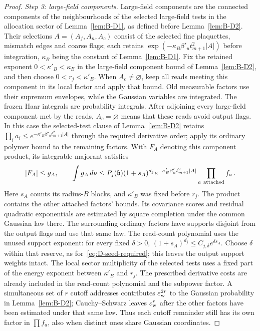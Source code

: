 \begin{proof}
\emph{Step 3: large-field components.} Large-field components are the connected components of the neighbourhoods of the selected large-field tests in the allocation sector of Lemma~\ref{lem:B-D1}, as defined before Lemma~\ref{lem:B-D2}. Their selections $A=(A_f,A_n,A_c)$ consist of the selected fine plaquettes, mismatch edges and coarse flags; each retains $\exp(-\kappa_B\beta'_u t_{m+1}^2|A|)$ before integration, $\kappa_B$ being the constant of Lemma~\ref{lem:B-D1}. Fix the retained exponent $0<\kappa'_B<\kappa_B$ in the large-field component bound of Lemma~\ref{lem:B-D2}, and then choose $0<r_j<\kappa'_B$. When $A_c\ne\varnothing$, keep all reads meeting this component in its local factor and apply that bound. Old measurable factors use their supremum envelopes, while the Gaussian variables are integrated. The frozen Haar integrals are probability integrals. After adjoining every large-field component met by the reads, $A_c=\varnothing$ means that these reads avoid output flags. In this case the selected-test clause of Lemma~\ref{lem:B-D2} retains $\prod_i a_i\le e^{-\kappa'_B\beta'_u t_{m+1}^2|A|}$ through the required derivative order; apply its ordinary polymer bound to the remaining factors. With $F_A$ denoting this component product, its integrable majorant satisfies
\begin{equation*}
|F_A|\le g_A,\qquad
\int g_A\,d\nu\le P_j(\mathfrak b)(1+s_A)^{d_j}
 e^{-\kappa'_B\beta'_u t_{m+1}^2|A|}\prod_{a\ {\rm attached}}f_a\,.
\end{equation*}
Here $s_A$ counts its radius-$B$ blocks, and $\kappa'_B$ was fixed before $r_j$. The product contains the other attached factors' bounds. Its covariance scores and residual quadratic exponentials are estimated by square completion under the common Gaussian law there. The surrounding ordinary factors have supports disjoint from the output flags and use that same law. The read-count polynomial uses the unused support exponent: for every fixed $\delta>0$, $(1+s_A)^{d_j}\le C_{j,\delta}e^{\delta s_A}$. Choose $\delta$ within that reserve, as for~\eqref{eq:D-seed-required}; this leaves the output support weights intact. The local sector multiplicity of the selected tests uses a fixed part of the energy exponent between $\kappa'_B$ and $r_j$. The prescribed derivative costs are already included in the read-count polynomial and the subpower factor. A simultaneous set of $r$ cutoff addresses contributes $\varepsilon_{\rm w}^{2r}$ to the Gaussian probability in Lemma~\ref{lem:B-D2}; Cauchy--Schwarz leaves $\varepsilon_{\rm w}^r$ after the other factors have been estimated under that same law. Thus each cutoff remainder still has its own factor in $\prod f_a$, also when distinct ones share Gaussian coordinates.


\end{proof}
